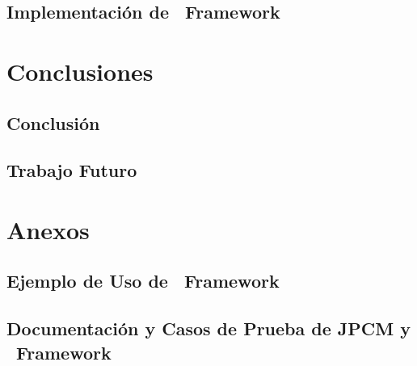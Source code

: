 \documentclass{report}
\begin{document}
        \chapter{Implementación de \nombreFramework \ Framework}
            

    \part{Conclusiones}
        \chapter{Conclusión}
            
        \chapter{Trabajo Futuro}
            

    \part{Anexos}
        \chapter{Ejemplo de Uso de \nombreFramework \ Framework}
            
        \chapter{Documentación y Casos de Prueba de JPCM y \nombreFramework \ Framework}
            
    
	
	
\end{document}
